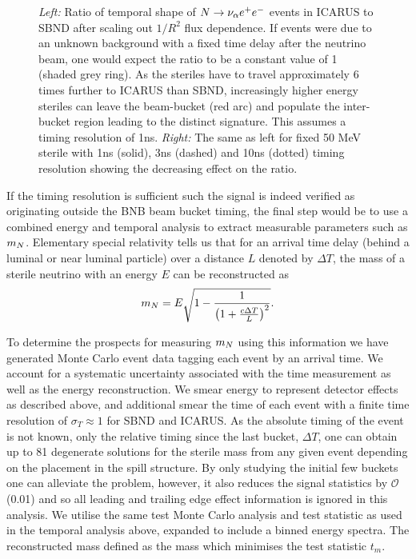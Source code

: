 \documentclass[11pt, a4paper]{article}
\def\ster{\ensuremath N}
\begin{document}
\begin{figure}[t]
\begin{subfigure}[t]{0.5\textwidth}
\end{subfigure}
\caption{\label{fig:icarus_the_great}
\emph{Left: }Ratio of temporal shape of $\ster \rightarrow \nu_\alpha e^+ e^-$ events in ICARUS to SBND after scaling out $1/R^2$ flux dependence. If events were due to an unknown background with a fixed time delay after the neutrino beam, one would expect the ratio to be a constant value of 1 (shaded grey ring). As the steriles have to travel approximately 6 times further to ICARUS than SBND, increasingly higher energy steriles can leave the beam-bucket (red arc) and populate the inter-bucket region leading to the distinct signature. This assumes a timing resolution of 1ns. \emph{Right: } The same as left for fixed 50 MeV sterile with 1ns (solid), 3ns (dashed) and 10ns (dotted) timing resolution showing the decreasing effect on the ratio.   }

\end{figure}

If the timing resolution is sufficient such the signal is indeed verified as
originating outside the BNB beam bucket timing, the final step would be to use
a combined energy and temporal analysis to extract measurable parameters such
as $m_\ster$. Elementary special relativity tells us that for an arrival time delay (behind a
luminal or near luminal particle) over a distance $L$ denoted by $\Delta T$,
the mass of a sterile neutrino with an energy $E$ can be reconstructed as 
%
\[ m_{\ster} = E\sqrt{1-\frac{1}{\left(1+\frac{c\Delta T}{L}\right)^2}}. \]

To determine the prospects for measuring $m_{\ster}$ using this information we
have generated Monte Carlo event data tagging each event by an arrival time.
We account for a systematic uncertainty associated with the time measurement as
well as the energy reconstruction. We smear energy to represent detector
effects as described above, and additional smear the time of each event with a
finite time resolution of $\sigma_T  \approx 1$ for SBND and ICARUS. As the
absolute timing of the event is not known, only the relative timing since the
last bucket, $\Delta T$, one can obtain up to 81 degenerate solutions for the
sterile mass from any given event depending on the placement in the spill
structure. By only studying the initial few buckets one can alleviate the
problem, however, it also reduces the signal statistics by $\mathcal{O}$(0.01)
and so all leading and trailing edge effect information is ignored in this analysis.
We utilise the same test Monte Carlo analysis and test statistic as used in the temporal analysis
above, expanded to include a binned energy spectra. The reconstructed mass defined
as the mass which minimises the test statistic $t_m$. 
\end{document}
